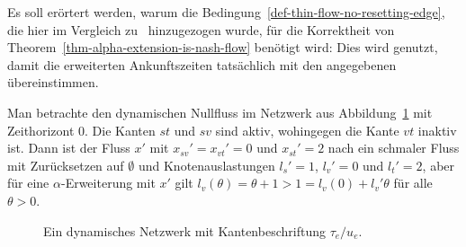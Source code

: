 \begin{remark}\label{remark-thin-flow-part-2}
	Es soll erörtert werden, warum die Bedingung~\ref{def-thin-flow-no-resetting-edge}, die hier im Vergleich zu~\cite[Definition~6]{Koch2011} hinzugezogen wurde, für die Korrektheit von Theorem~\ref{thm-alpha-extension-is-nash-flow} benötigt wird:
	Dies wird genutzt, damit die erweiterten Ankunftszeiten tatsächlich mit den angegebenen übereinstimmen.
	
	Man betrachte den dynamischen Nullfluss im Netzwerk aus Abbildung~\ref{figure-labels} mit Zeithorizont $0$.
	Die Kanten $st$ und $sv$ sind aktiv, wohingegen die Kante $vt$ inaktiv ist.
	Dann ist der Fluss $x'$ mit $x_{sv}'=x_{vt}' = 0$ und $x_{st}'=2$ nach \cite[Definition 6]{Koch2011} ein schmaler Fluss mit Zurücksetzen auf $\emptyset$ und Knotenauslastungen $l_s' = 1$, $l_v' = 0$ und $l_t' = 2$, aber für eine $\alpha$-Erweiterung mit $x'$ gilt $l_v(\theta) = \theta + 1 > 1 = l_v(0) + l_v' \theta$ für alle $\theta > 0$.

	\begin{figure}
		\centering
		\caption{Ein dynamisches Netzwerk mit Kantenbeschriftung $\tau_e / u_e$.}
		\label{figure-labels}
	\end{figure}
\end{remark}


